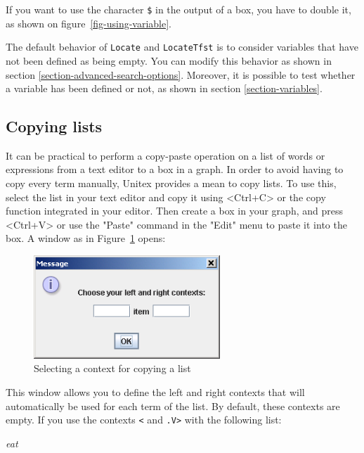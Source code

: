 \noindent If you want to use the character \verb+$+ in the output of a box, you
have to double it, as shown on figure~\ref{fig-using-variable}.

\bigskip
\noindent The default behavior of \verb+Locate+ and \verb+LocateTfst+ is to
consider variables that have not been defined as being empty. You can
modify this behavior as shown in section \ref{section-advanced-search-options}.
Moreover, it is possible to test whether a variable has been defined or not, as
shown in section \ref{section-variables}.

\subsection{Copying lists}

It can be practical to perform a copy-paste operation on a list of words or
expressions from a text editor to a box in a graph. In order to avoid having to
copy every term manually, Unitex provides a mean to copy lists. To use this,
select the list in your text editor and copy it using <Ctrl+C> or the copy
function integrated in your editor. Then create a box in your graph, and press
<Ctrl+V> or use the "Paste" command in the "Edit" menu to paste it into the box.
A window as in Figure~\ref{fig-setting-contexts-for-multiple-copy}
opens:

\bigskip
\begin{figure}[h]
\begin{center}
\includegraphics[width=7cm]{resources/img/fig5-18.png}
\caption{Selecting a context for copying a list\label{fig-setting-contexts-for-multiple-copy}}
\end{center}
\end{figure}

\noindent This window allows you to define the left and right contexts that will
automatically be used for each term of the list. By default, these contexts are
empty. If you use the contexts  \verb+<+ and \verb+.V>+ with the following list:

\bigskip
\textit{eat}

